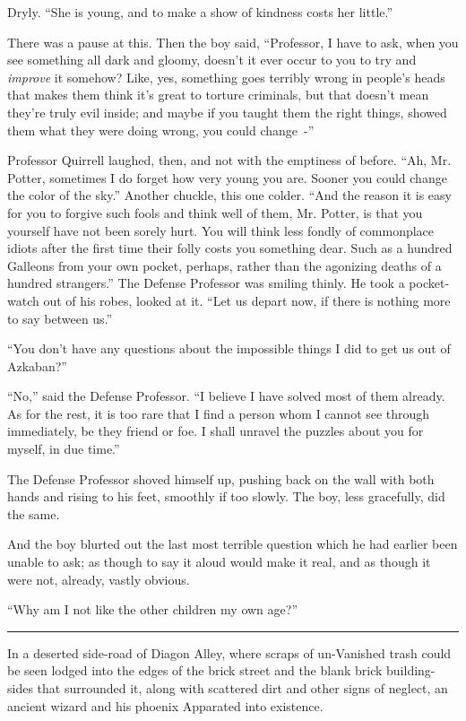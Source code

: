 Dryly. ``She is young, and to make a show of kindness costs her little.''

There was a pause at this. Then the boy said, ``Professor, I have to ask, when you see something all dark and gloomy, doesn't it ever occur to you to try and \emph{improve} it somehow? Like, yes, something goes terribly wrong in people's heads that makes them think it's great to torture criminals, but that doesn't mean they're truly evil inside; and maybe if you taught them the right things, showed them what they were doing wrong, you could change~-''

Professor Quirrell laughed, then, and not with the emptiness of before. ``Ah, Mr. Potter, sometimes I do forget how very young you are. Sooner you could change the color of the sky.'' Another chuckle, this one colder. ``And the reason it is easy for you to forgive such fools and think well of them, Mr. Potter, is that you yourself have not been sorely hurt. You will think less fondly of commonplace idiots after the first time their folly costs you something dear. Such as a hundred Galleons from your own pocket, perhaps, rather than the agonizing deaths of a hundred strangers.'' The Defense Professor was smiling thinly. He took a pocket-watch out of his robes, looked at it. ``Let us depart now, if there is nothing more to say between us.''

``You don't have any questions about the impossible things I did to get us out of Azkaban?''

``No,'' said the Defense Professor. ``I believe I have solved most of them already. As for the rest, it is too rare that I find a person whom I cannot see through immediately, be they friend or foe. I shall unravel the puzzles about you for myself, in due time.''

The Defense Professor shoved himself up, pushing back on the wall with both hands and rising to his feet, smoothly if too slowly. The boy, less gracefully, did the same.

And the boy blurted out the last most terrible question which he had earlier been unable to ask; as though to say it aloud would make it real, and as though it were not, already, vastly obvious.

``Why am I not like the other children my own age?''

\begin{center}\rule{3in}{0.4pt}\end{center}

In a deserted side-road of Diagon Alley, where scraps of un-Vanished trash could be seen lodged into the edges of the brick street and the blank brick building-sides that surrounded it, along with scattered dirt and other signs of neglect, an ancient wizard and his phoenix Apparated into existence.

